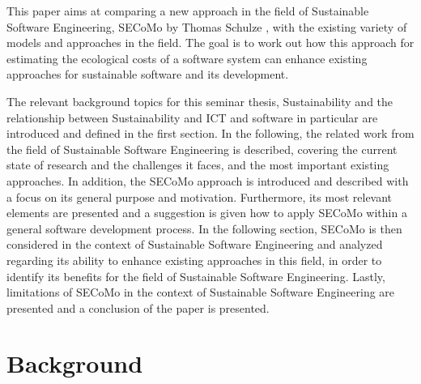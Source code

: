 \documentclass[oribibl]{llncs}
\begin{document}
This paper aims at comparing a new approach in the field of Sustainable Software Engineering, SECoMo by Thomas Schulze \cite{schulze_cost_2016}, with the existing variety of models and approaches in the field. The goal is to work out how this approach for estimating the ecological costs of a software system can enhance existing approaches for sustainable software and its development. %

The relevant background topics for this seminar thesis, Sustainability and the relationship between Sustainability and ICT and software in particular are introduced and defined in the first section. In the following, the related work from the field of Sustainable Software Engineering is described, covering the current state of research and the challenges it faces, and the most important existing approaches. %
In addition, the SECoMo approach is introduced %
and described with a focus on its general purpose and motivation. Furthermore, its most relevant elements are presented and a suggestion is given how to apply SECoMo within a general software development process. %
 In the following section, SECoMo is then considered in the context of Sustainable Software Engineering and analyzed regarding its ability to enhance existing approaches in this field, in order to identify its benefits for the field of Sustainable Software Engineering. Lastly, limitations of SECoMo in the context of Sustainable Software Engineering are presented and a conclusion of the paper is presented.

\section{Background}
\end{document}

